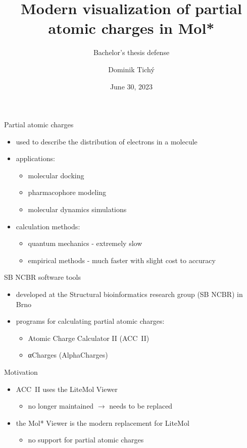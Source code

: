 \documentclass[
]{beamer}
\title[Modern visualization of partial atomic charges in Mol*]{Modern visualization of partial atomic charges in Mol*}
\subtitle[Short Presentation Subtitle]{Bachelor's thesis defense}
\author[Dominik Tichý]{Dominik Tichý}
\institute[FI MU]{Faculty of Informatics, Masaryk University}
\date{June 30, 2023}
\begin{document}
\begin{frame}[plain]
\maketitle
\end{frame}

\begin{frame}{Partial atomic charges}
  \begin{itemize}
    \item used to describe the distribution of electrons in a molecule
    \item applications:
    \begin{itemize}
      \item molecular docking
      \item pharmacophore modeling
      \item molecular dynamics simulations
    \end{itemize}
    \item calculation methods:
    \begin{itemize}
      \item quantum mechanics - extremely slow
      \item empirical methods - much faster with slight cost to accuracy
    \end{itemize}
  \end{itemize}
\end{frame}

\begin{frame}{SB NCBR software tools}
  \begin{itemize}
    \item developed at the Structural bioinformatics research group (SB NCBR) in Brno
    \item programs for calculating partial atomic charges:
    \begin{itemize}
      \item Atomic Charge Calculator II (ACC~II)
      \item αCharges (AlphaCharges)
    \end{itemize}
  \end{itemize}
\end{frame}

\begin{frame}{Motivation}
  \begin{itemize}
    \item ACC~II uses the LiteMol Viewer
    \begin{itemize}
      \item no longer maintained $\rightarrow$ needs to be replaced
    \end{itemize}
    \item the Mol* Viewer is the modern replacement for LiteMol
    \begin{itemize}
      \item no support for partial atomic charges
    \end{itemize}
  \end{itemize}
\end{frame}
\end{document}
